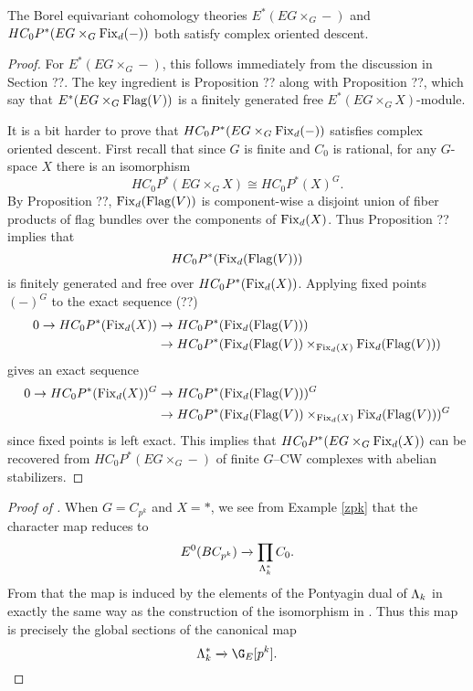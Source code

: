 \begin{proposition}
The Borel equivariant cohomology theories $E^*(EG \times_G -)$ and $HC_{0}P^{*}(EG \times_G \operatorname{Fix}_d(-))$ both satisfy complex oriented descent.
\end{proposition}
\begin{proof}
For $E^*(EG \times_G -)$, this follows immediately from the discussion in Section ??. The key ingredient is Proposition ?? along with Proposition ??, which say that $E^*(EG \times_G \operatorname{Flag}(V))$ is a finitely generated free $E^*(EG \times_G X)$-module. 

It is a bit harder to prove that $HC_{0}P^{*}(EG \times_G \operatorname{Fix}_d(-))$ satisfies complex oriented descent. First recall that since $G$ is finite and $C_0$ is rational, for any $G$-space $X$ there is an isomorphism
\[
HC_0P^*(EG \times_G X) \cong HC_0P^*(X)^G.
\]
By Proposition ??, $\operatorname{Fix}_d(\operatorname{Flag}(V))$ is component-wise a disjoint union of fiber products of flag bundles over the components of $\operatorname{Fix}_d(X)$. Thus Proposition ?? implies that
\[
HC_0P^*(\operatorname{Fix}_d(\operatorname{Flag}(V)))
\]
is finitely generated and free over $HC_0P^*(\operatorname{Fix}_d(X))$. Applying fixed points $(-)^G$ to the exact sequence (??)
\begin{align*}
0 \to HC_0P^*(\operatorname{Fix}_d(X)) & \to HC_0P^*(\operatorname{Fix}_d(\operatorname{Flag}(V))) \\
& \to HC_0P^*(\operatorname{Fix}_d(\operatorname{Flag}(V)) \times_{\operatorname{Fix}_d(X)} \operatorname{Fix}_d(\operatorname{Flag}(V)))
\end{align*}
gives an exact sequence
\begin{align*}
0 \to HC_0P^*(\operatorname{Fix}_d(X))^G & \to HC_0P^*(\operatorname{Fix}_d(\operatorname{Flag}(V)))^G \\
& \to HC_0P^*(\operatorname{Fix}_d(\operatorname{Flag}(V)) \times_{\operatorname{Fix}_d(X)} \operatorname{Fix}_d(\operatorname{Flag}(V)))^G
\end{align*}
since fixed points is left exact. This implies that $HC_0P^*(EG \times_G \operatorname{Fix}_d(X))$ can be recovered from $HC_0P^*(EG \times_G-)$ of finite $G$--CW complexes with abelian stabilizers.
\end{proof}

\begin{proof}[{Proof of }]
When $G = C_{p^k}$ and $X = \ast$, we see from Example \ref{zpk} that the character map reduces to
\[
E^0(BC_{p^k}) \xrightarrow{} \prod_{\Lambda_k^*}C_{0}.
\]
From  that the map is induced by the elements of the Pontyagin dual of $\Lambda_k$ in exactly the same way as the construction of the isomorphism in . Thus this map is precisely the global sections of the canonical map
\[
\Lambda_{k}^* \xrightarrow{} \G_{E}[p^k]. \qedhere
\]
\end{proof}




